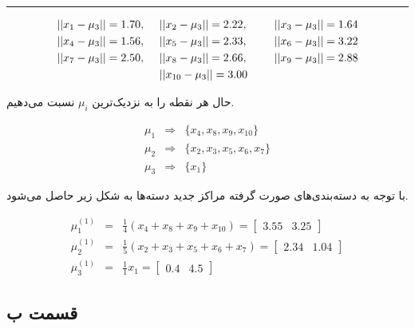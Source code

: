 \documentclass[12pt, a4paper]{article}
\begin{document}
\begin{center}
\rule{0.3\linewidth}{0.5pt}
\end{center}

\begin{eqnarray*}
    ||x_1 - \mu_3|| = 1.70, & \hspace{.5cm} ||x_2 - \mu_3|| = 2.22, & \hspace{.5cm} ||x_3 - \mu_3|| = 1.64 \\
    ||x_4 - \mu_3|| = 1.56, & \hspace{.5cm} ||x_5 - \mu_3|| = 2.33, & \hspace{.5cm} ||x_6 - \mu_3|| = 3.22 \\
    ||x_7 - \mu_3|| = 2.50, & \hspace{.5cm} ||x_8 - \mu_3|| = 2.66, & \hspace{.5cm} ||x_9 - \mu_3|| = 2.88 \\
    & \hspace{.5cm} ||x_{10} - \mu_3|| = 3.00 &
\end{eqnarray*}

حال هر نقطه را به نزدیک‌ترین $\mu_i$ نسبت می‌دهیم.

\begin{eqnarray*}
    \mu_1 & \Longrightarrow & \{x_4, x_8, x_9, x_{10} \} \\
    \mu_2 & \Longrightarrow & \{x_2, x_3, x_5, x_6, x_7 \} \\
    \mu_3 & \Longrightarrow & \{x_1 \}
\end{eqnarray*}

با توجه به دسته‌بندی‌های صورت گرفته مراکز جدید دسته‌ها به شکل زیر حاصل می‌شود.

\begin{eqnarray*}
    \mu_1^{(1)} & = & \frac{1}{4} (x_4 + x_8 + x_9 + x_{10}) = \begin{bmatrix}3.55& 3.25\end{bmatrix} \\
    \mu_2^{(1)} & = & \frac{1}{5} (x_2 + x_3 + x_5 + x_6 + x_7) = \begin{bmatrix}2.34 & 1.04\end{bmatrix} \\
    \mu_3^{(1)} & = & \frac{1}{1} x_1  = \begin{bmatrix}0.4& 4.5\end{bmatrix}
\end{eqnarray*}

\subsection*{قسمت ب}
\end{document}
